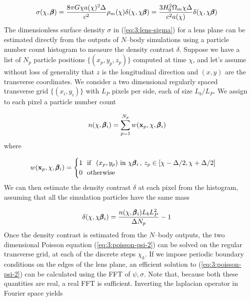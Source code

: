 \begin{equation}
\label{eq:3:lens-sigma}
\sigma(\chi,\pmb{\beta}) = \frac{8\pi G \chi a(\chi)^2\Delta}{c^2}\rho_m(\chi)\delta(\chi,\chi\pmb{\beta}) = \frac{3H_0^2\Omega_m\chi\Delta}{c^2 a(\chi)}\delta(\chi,\chi\pmb{\beta})
\end{equation}
%
The dimensionless surface density $\sigma$ in (\ref{eq:3:lens-sigma}) for a lens plane can be estimated directly from the outputs of $N$--body simulations using a particle number count histogram to measure the density contrast $\delta$. Suppose we have a list of $N_p$ particle positions $\{(x_p,y_p,z_p)\}$ computed at time $\chi$, and let's assume without loss of generality that $z$ is the longitudinal direction and $(x,y)$ are the transverse coordinates. We consider a two dimensional regularly spaced transverse grid $\{(x_i,y_i)\}$ with $L_P$ pixels per side, each of size $L_b/L_P$. We assign to each pixel a particle number count

\begin{equation}
\label{eq:3:number-hist}
n(\chi, \pmb{\beta}_i) = \sum_{p=1}^{N_p}w(\mathbf{x}_p,\chi,\pmb{\beta}_i)
\end{equation}  
%
where 

\begin{equation}
\label{eq:3:number-kernel}
w(\mathbf{x}_p,\chi,\pmb{\beta}_i) = 
\begin{cases}
1 \,\,\,\, {\rm if} \,\,\,\, (x_p,y_p) \,\, {\rm in} \,\, \chi\pmb{\beta}_i \, , \, z_p\in [\chi-\Delta/2,\chi+\Delta/2] \\
0 \,\,\,\, {\rm otherwise}
\end{cases}
\end{equation}
%
We can then estimate the density contrast $\delta$ at each pixel from the histogram, assuming that all the simulation particles have the same mass

\begin{equation}
\label{eq:3:delta-hist}
\delta(\chi,\chi\pmb{\beta}_i) = \frac{n(\chi,\pmb{\beta}_i)L_bL_P^2 }{\Delta N_p} - 1
\end{equation}
%
Once the density contrast is estimated from the $N$--body outputs, the two dimensional Poisson equation (\ref{eq:3:poisson-psi-2}) can be solved on the regular transverse grid, at each of the discrete steps $\chi_k$. If we impose periodic boundary conditions on the edges of the lens plane, an efficient solution to (\ref{eq:3:poisson-psi-2}) can be calculated using the FFT of $\psi,\sigma$. Note that, because both these quantities are real, a real FFT is sufficient. Inverting the laplacian operator in Fourier space yields

